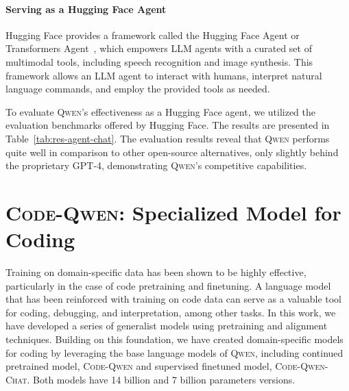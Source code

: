 \paragraph{Serving as a Hugging Face Agent}

Hugging Face provides a framework called the Hugging Face Agent or Transformers Agent~\citep{transformers-agents}, which empowers LLM agents with a curated set of multimodal tools, including speech recognition and image synthesis. This framework allows an LLM agent to interact with humans, interpret natural language commands, and employ the provided tools as needed.

To evaluate \textsc{Qwen}'s effectiveness as a Hugging Face agent, we utilized the evaluation benchmarks offered by Hugging Face. The results are presented in Table~\ref{tab:res-agent-chat}. The evaluation results reveal that \textsc{Qwen} performs quite well in comparison to other open-source alternatives, only slightly behind the proprietary GPT-4, demonstrating \textsc{Qwen}'s competitive capabilities.

\section{\textsc{Code-Qwen}: Specialized Model for Coding}
\label{sec:coding}

Training on domain-specific data has been shown to be highly effective, particularly in the case of code pretraining and finetuning. A language model that has been reinforced with training on code data can serve as a valuable tool for coding, debugging, and interpretation, among other tasks. In this work, we have developed a series of generalist models using pretraining and alignment techniques. Building on this foundation, we have created domain-specific models for coding by leveraging the base language models of \textsc{Qwen}, including continued pretrained model, \textsc{Code-Qwen} and supervised finetuned model, \textsc{Code-Qwen-Chat}. Both models have \num{14} billion and \num{7} billion parameters versions.


